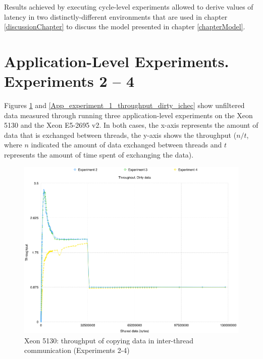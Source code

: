 Results achieved by executing cycle-level experiments allowed to derive values of latency in two distinctly-different environments that are used in chapter \ref{discussionChapter} to discuss the model presented in chapter \ref{chapterModel}.

\section{Application-Level Experiments. Experiments 2 -- 4}
\label{results_app_experiments}

Figures \ref{App_experiment_1_throughput_dirty_nuim} and \ref{App_experiment_1_throughput_dirty_ichec} show unfiltered data measured through running three application-level experiments on the Xeon 5130 and the Xeon E5-2695 v2. In both cases, the x-axis represents the amount of data that is exchanged between threads, the y-axis shows the throughput ($n / t$, where $n$ indicated the amount of data exchanged between threads and $t$ represents the amount of time spent of exchanging the data).

\begin{figure}[!htb]
\centering
\includegraphics[width=145mm]{6/App_experiment_1_dirty_throughput_nuim.png}
\caption{Xeon 5130: throughput of copying data in inter-thread communication (Experiments 2-4)}
\label{App_experiment_1_throughput_dirty_nuim}
\end{figure}

